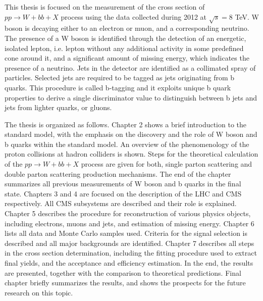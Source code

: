 \par This thesis is focused on the measurement of the cross section of $pp\rightarrow W+bb+X$ process using the data collected during 2012 at $\sqrt{s} = 8$ TeV. W boson is decaying either to an electron or muon, and a corresponding neutrino. The presence of a W boson is identified through the detection of an energetic, isolated lepton, i.e. lepton without any additional activity in some predefined cone around it, and a significant amount of missing energy, which indicates the presence of a neutrino. Jets in the detector are identified as a collimated spray of particles. Selected jets are required to be tagged as jets originating from b quarks. This procedure is called b-tagging and it exploits unique b quark properties to derive a single discriminator value to distinguish between b jets and jets from lighter quarks, or gluons. 

The thesis is organized as follows. Chapter 2 shows a brief introduction to the standard model, with the emphasis on the discovery and the role of W boson and b quarks within the standard model. An overview of the phenomenology of the proton collisions at hadron colliders is shown. Steps for the theoretical calculation of the $pp\rightarrow W+bb+X$ process are given for both, single parton scattering and double parton scattering production mechanisms. The end of the chapter summarizes all previous measurements of W boson and b quarks in the final state. Chapters 3 and 4 are focused on the description of the LHC and CMS respectively. All CMS subsystems are described and their role is explained. Chapter 5 describes the procedure for reconstruction of various physics objects, including electrons, muons and jets, and estimation of missing energy. Chapter 6 lists all data and Monte Carlo samples used. Criteria for the signal selection is described and all major backgrounds are identified. Chapter 7 describes all steps in the cross section determination, including the fitting procedure used to extract final yields, and the acceptance and efficiency estimation. In the end, the results are presented, together with the comparison to theoretical predictions. Final chapter briefly summarizes the results, and shows the prospects for the future research on this topic.

